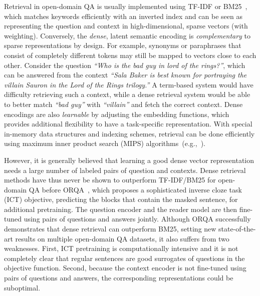 \documentclass[11pt,a4paper]{article}
\newcommand\ti[1]{\textit{#1}}
\begin{document}
Retrieval in open-domain QA is usually implemented using TF-IDF or BM25~\cite{robertson2009probabilistic}, which matches keywords efficiently with an inverted index and can be seen
as representing the question and context in high-dimensional, sparse vectors (with weighting).
Conversely, the \emph{dense}, latent semantic encoding is \emph{complementary} to sparse representations by design.
For example, synonyms or paraphrases
that consist of completely different tokens may still be mapped to vectors close to each other.
Consider the question \ti{``Who is the bad guy in lord of the rings?''}, which can be answered from the context
\ti{``Sala Baker is best known for portraying the villain Sauron in the Lord of the Rings trilogy.''}
A term-based system would have difficulty retrieving such a context, while a dense retrieval system would be able to better match \ti{``bad guy''} with \ti{``villain''}
and fetch the correct context.
Dense encodings are also \emph{learnable} by adjusting the embedding functions, which provides additional flexibility to have a task-specific representation. With special in-memory data structures and indexing schemes, retrieval can be done efficiently using maximum inner product search (MIPS) algorithms~(e.g.,~\citet{NIPS2014_5329, guo2016quantization}).




However, it is generally believed that learning a good dense vector representation needs a large number of labeled pairs of question and contexts.
Dense retrieval methods have thus never be shown to outperform TF-IDF/BM25 for open-domain QA before ORQA~\cite{lee2019latent}, which proposes a sophisticated inverse cloze task (ICT) objective, predicting the blocks that contain the masked sentence, for additional pretraining.
The question encoder and the reader model are then fine-tuned using pairs of questions and answers jointly. Although ORQA successfully demonstrates that dense retrieval can outperform BM25, setting new state-of-the-art results on multiple open-domain QA datasets,
it also suffers from two weaknesses.
First, ICT pretraining is computationally intensive and it is not completely clear that regular sentences are good surrogates of questions in the objective function.
Second, because the context encoder is not fine-tuned using pairs of questions and answers, the corresponding representations could be suboptimal.
\end{document}
